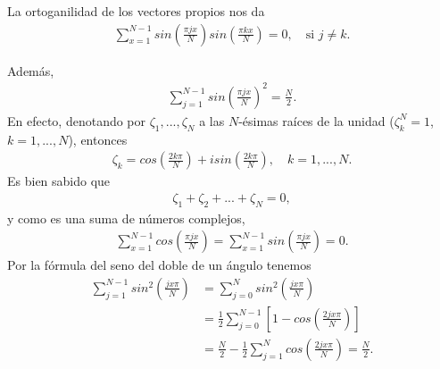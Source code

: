 \documentclass{article}
\numberwithin{equation}{section}
\begin{document}
La ortoganilidad de los vectores propios nos da
\begin{align}\label{orto-cero}
    \sum_{x=1}^{N-1}sin\left(\frac{\pi j x}{N}\right)sin\left(\frac{\pi k x}{N}\right) = 0, \quad \text{si }
j\not = k.
\end{align}

Además,
\begin{align}\label{orto-seno}
    \sum_{j=1}^{N-1}sin\left(\frac{\pi j x}{N}\right)^2 = \frac{N}{2}.
\end{align}
En efecto, denotando por $\zeta_1,...,\zeta_N$ a las $N$-ésimas raíces de la unidad ($\zeta_k^N = 1$, $k = 1,...,N$), entonces
\begin{align*}
    \zeta_k = cos\left(\frac{2k\pi}{N}\right)+isin\left(\frac{2k\pi}{N}\right), \quad k=1,...,N.
\end{align*}
Es bien sabido que 
\begin{align*}
    \zeta_1+\zeta_2+...+\zeta_N = 0,
\end{align*}
y como es una suma de números complejos,
\begin{align*}
     \sum_{x=1}^{N-1}cos\left(\frac{\pi j x}{N}\right) = \sum_{x=1}^{N-1}sin\left(\frac{\pi j x}{N}\right) = 0.
\end{align*}
Por la fórmula del seno del doble de un ángulo tenemos
\begin{align*}
    \sum_{j=1}^{N-1}sin^2\left(\frac{jx\pi}{N} \right) &= \sum_{j=0}^{N}sin^2\left(\frac{jx\pi}{N} \right) \\
    &= \frac{1}{2}\sum_{j=0}^{N-1}\left[1-cos\left(\frac{2jx\pi}{N}\right)\right] \\
    &= \frac{N}{2}-\frac{1}{2}\sum_{j=1}^Ncos\left(\frac{2jx\pi}{N}\right) = \frac{N}{2}.
\end{align*}
\end{document}
